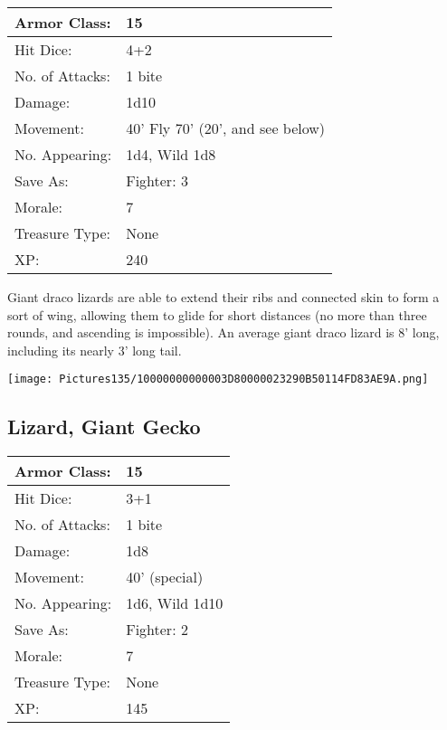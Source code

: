 \documentclass[a4paper,twoside,openany,10pt]{book}
\begin{document}
\begin{multicols}{2}
\begin{tabularx}{0.50\textwidth}{@{}lX@{}}
Armor Class: & 15 \\\hline
Hit Dice: & 4+2 \\\hline
No. of Attacks: & 1 bite \\\hline
Damage: & 1d10 \\\hline
Movement: & 40' Fly 70'
(20', and see below) \\\hline
No. Appearing: & 1d4, Wild 1d8 \\\hline
Save As: & Fighter: 3 \\\hline
Morale: & 7 \\\hline
Treasure Type: & None \\\hline
XP: & 240 \\\hline
\end{tabularx}\medskip

Giant draco lizards are able to extend their ribs and connected skin to
form a sort of wing, allowing them to glide for short distances (no more
than three rounds, and ascending is impossible). An average giant draco
lizard is 8' long, including its nearly
3' long tail.

\begin{center} \texttt{[image: Pictures135/10000000000003D80000023290B50114FD83AE9A.png]} \end{center}


\subsection*{Lizard, Giant Gecko}\label{lizard-giant-gecko}

\begin{tabularx}{0.50\textwidth}{@{}lX@{}}
Armor Class: & 15 \\\hline
Hit Dice: & 3+1 \\\hline
No. of Attacks: & 1 bite \\\hline
Damage: & 1d8 \\\hline
Movement: & 40' (special) \\\hline
No. Appearing: & 1d6, Wild 1d10 \\\hline
Save As: & Fighter: 2 \\\hline
Morale: & 7 \\\hline
Treasure Type: & None \\\hline
XP: & 145 \\\hline
\end{tabularx}\medskip


\end{multicols}
\end{document}
